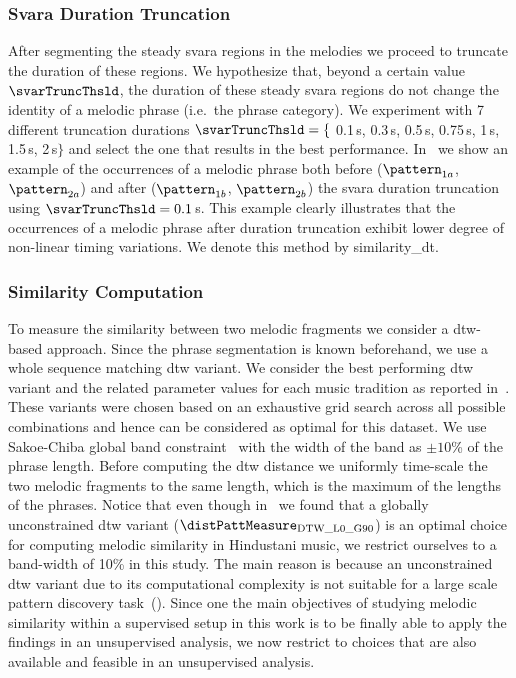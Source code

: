 \subsubsection{Svara Duration Truncation}
\label{sec:patterns_improving_similarity_svara_duration_trucation}

After segmenting the steady \gls{svara} regions in the melodies we proceed to truncate the duration of these regions. We hypothesize that, beyond a certain value $\svarTruncThsld$, the duration of these steady \gls{svara} regions do not change the identity of a melodic phrase (i.e.~the phrase category). We experiment with 7 different truncation durations $\svarTruncThsld = \lbrace$ 0.1\,s, 0.3\,s, 0.5\,s, 0.75\,s, 1\,s, 1.5\,s, 2\,s$\rbrace$ and select the one that results in the best performance. In~
we show an example of the occurrences of a melodic phrase both before ($\pattern_{1a}$, $\pattern_{2a}$) and after ($\pattern_{1b}$, $\pattern_{2b}$) the \gls{svara} duration truncation using $\svarTruncThsld = 0.1$\,s. This example clearly illustrates that the occurrences of a melodic phrase after duration truncation exhibit lower degree of non-linear timing variations. We denote this method by \acrshort{similarity_dt}.

\subsubsection{Similarity Computation}
\label{sec:patterns_improving_similarity_similarity_computation}

To measure the similarity between two melodic fragments we consider a \gls{dtw}-based approach. Since the phrase segmentation is known beforehand, we use a whole sequence matching \gls{dtw} variant. We consider the best performing \gls{dtw} variant and the related parameter values for each music tradition as reported in~. These variants were chosen based on an exhaustive grid search across all possible combinations and hence can be considered as optimal for this dataset. We use Sakoe-Chiba global band constraint~\cite{Sakoe78TASLP} with the width of the band as $\pm10$\% of the phrase length. Before computing the \gls{dtw} distance we uniformly time-scale the two melodic fragments to the same length, which is the maximum of the lengths of the phrases. Notice that even though in~ we found that a globally unconstrained \gls{dtw} variant ($\distPattMeasure_{\mathrm{DTW\_L0\_G90}}$) is an optimal choice for computing melodic similarity in Hindustani music, we restrict ourselves to a band-width of 10\% in this study. The main reason is because an unconstrained \gls{dtw} variant due to its computational complexity is not suitable for a large scale pattern discovery task~(). Since one the main objectives of studying melodic similarity within a supervised setup in this work is to be finally able to apply the findings in an unsupervised analysis, we now restrict to choices that are also available and feasible in an unsupervised analysis.


